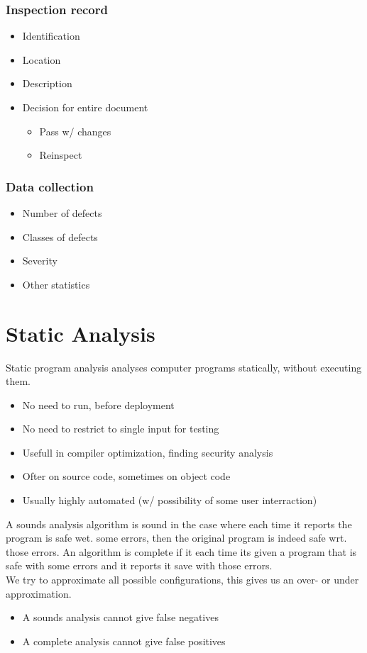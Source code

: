 \documentclass[course, english]{Notes}
\begin{document}
\subsubsection{Inspection record}
\begin{itemize}
	\item Identification
	\item Location
	\item Description
	\item Decision for entire document
		\begin{itemize}
			\item Pass w/ changes
			\item Reinspect
		\end{itemize}
\end{itemize}
\subsubsection{Data collection}
\begin{itemize}
	\item Number of defects
	\item Classes of defects
	\item Severity
	\item Other statistics
\end{itemize}

\section{Static Analysis}
Static program analysis analyses computer programs statically, without executing
them.
\begin{itemize}
	\item No need to run, before deployment
	\item No need to restrict to single input for testing
	\item Usefull in compiler optimization, finding security analysis
	\item Ofter on source code, sometimes on object code
	\item Usually highly automated (w/ possibility of some user
		interraction)
\end{itemize}
A sounds analysis algorithm is sound in the case where each time it reports the
program is safe wet. some errors, then the original program is indeed safe wrt.
those errors. An algorithm is complete if it each time its given a program that
is safe with some errors and it reports it save with those errors.
\\
We try to approximate all possible configurations, this gives us an over- or
under approximation.
\begin{itemize}
	\item A sounds analysis cannot give false negatives
	\item A complete analysis cannot give false positives
\end{itemize}
\end{document}
